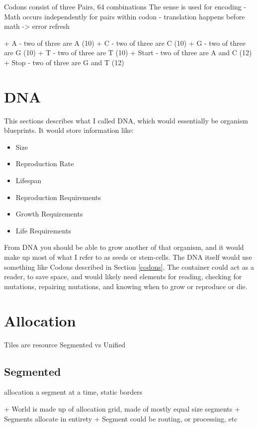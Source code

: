 \documentclass[article,12pt,oneside]{memoir}
\begin{document}
Codons consist of three Pairs, 64 combinations
The sense is used for encoding
- Math occurs independently for pairs within codon
- translation happens before math -> error refresh

+ A - two of three are A (10)
+ C - two of three are C (10)
+ G - two of three are G (10)
+ T - two of three are T (10)
+ Start - two of three are A and C (12)
+ Stop - two of three are G and T (12)


\section{DNA}

This sections describes what I called DNA, which would essentially be organism blueprints.
It would store information like:

\begin{itemize}
	\item Size
	\item Reproduction Rate
	\item Lifespan
	\item Reproduction Requirements
	\item Growth Requirements
	\item Life Requirements
\end{itemize}

From DNA you should be able to grow another of that organism, and it would make up most of what I refer to as seeds or stem-cells.
The DNA itself would use something like Codons described in Section \ref{codons}.
The container could act as a reader, to save space, and would likely need elements for reading, checking for mutations, repairing mutations, and knowing when to grow or reproduce or die.


\section{Allocation}

Tiles are resource
Segmented vs Unified

\subsection{Segmented}

allocation a segment at a time, static borders

+ World is made up of allocation grid, made of mostly equal size segments
+ Segments allocate in entirety 
+ Segment could be routing, or processing, etc
\end{document}
